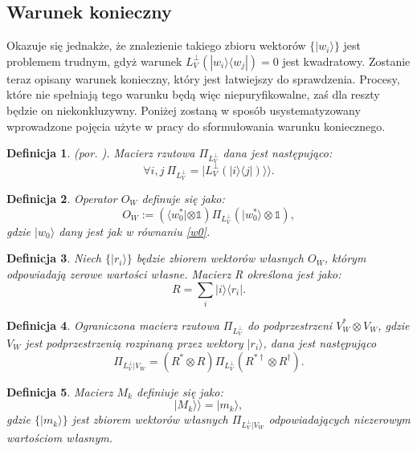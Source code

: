 \documentclass[10pt]{article} %
\newtheorem{definicja}{Definicja}
\newcommand{\Ket}[1]{|#1\rangle}
\newcommand{\Bra}[1]{\langle#1|}
\newcommand{\KKet}[1]{|#1\rangle\rangle}
\newcommand{\I}{\mathbb{1}}
\newcommand{\LPV}{{L^\perp_V}}
\begin{document}
\subsection{Warunek konieczny}
Okazuje się jednakże, że znalezienie takiego zbioru wektorów $\{ \Ket{w_i} \}$ jest problemem trudnym, gdyż warunek $L^\perp_V(\Ket{w_i}\Bra{w_j})=0$ jest kwadratowy. 
Zostanie teraz opisany warunek konieczny, który jest łatwiejszy do sprawdzenia. Procesy, które nie spełniają tego warunku będą więc niepuryfikowalne, zaś dla reszty będzie on niekonkluzywny. Poniżej zostaną w sposób usystematyzowany wprowadzone pojęcia użyte w pracy \cite{purification} do sformułowania 
warunku koniecznego.
\begin{definicja}
(por. \cite{purification}).
Macierz rzutowa $\Pi_\LPV$ dana jest następująco:
\begin{equation}
\forall i,j ~\Pi_\LPV = \KKet{\LPV(\Ket{i}\Bra{j})}.
\end{equation}
\end{definicja}
\begin{definicja}
Operator $O_W$ definuje się jako:
\begin{equation}
O_W:= \left(\Bra{w^*_0} \otimes \I\right) \Pi_\LPV \left( \Ket{w^*_0} \otimes \I\right),
\end{equation}
gdzie $\Ket{w_0}$ dany jest jak w równaniu \eqref{w0}.
\end{definicja}
\begin{definicja}
Niech $\{\Ket{r_i}\}$ będzie zbiorem wektorów własnych $O_W$, którym odpowiadają zerowe wartości własne. Macierz R określona jest jako:
\begin{equation}
R = \sum_i \Ket{i}\Bra{r_i}.
\end{equation}
\end{definicja}
\begin{definicja}
Ograniczona macierz rzutowa $\Pi_\LPV$ do podprzestrzeni $V_W^* \otimes V_W$, gdzie $V_W$ jest podprzestrzenią rozpinaną przez wektory $\Ket{r_i}$, dana jest następująco
\begin{equation}
\Pi_{\LPV|V_W} = (R^* \otimes R) \Pi_\LPV (R^{*\dag} \otimes R^\dag).
\end{equation}
\end{definicja}
\begin{definicja}
Macierz $M_k$ definiuje się jako:
\begin{equation}
\KKet{M_k} = \Ket{m_k},
\end{equation} gdzie $\{ \Ket{m_k} \}$ jest zbiorem wektorów własnych $\Pi_{\LPV|V_W}$ odpowiadających niezerowym wartościom własnym.
\end{definicja}
\end{document}
